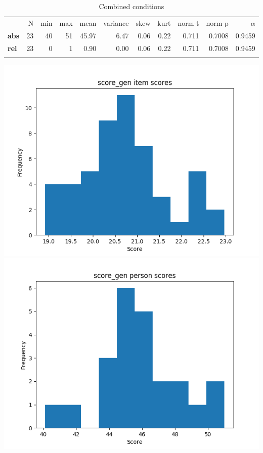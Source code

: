 \begin{longtable}[c]{@{}lrrrrrrrrrr@{}}
\caption{Combined conditions}
\endfirsthead
\toprule\addlinespace
& N & min & max & mean & variance & skew & kurt & norm-t &
norm-p & $\alpha$
\\\addlinespace
\midrule
\textbf{abs} & 23 & 40 & 51 & 45.97 & 6.47 & 0.06 & 0.22 & 0.711 &
0.7008 & 0.9459
\\\addlinespace
\textbf{rel} & 23 & 0 & 1 & 0.90 & 0.00 & 0.06 & 0.22 & 0.711 & 0.7008 &
0.9459
\\\addlinespace
\bottomrule
\end{longtable}

\includegraphics{img/score_gen_diff.png}
\includegraphics{img/score_gen_abil.png}

